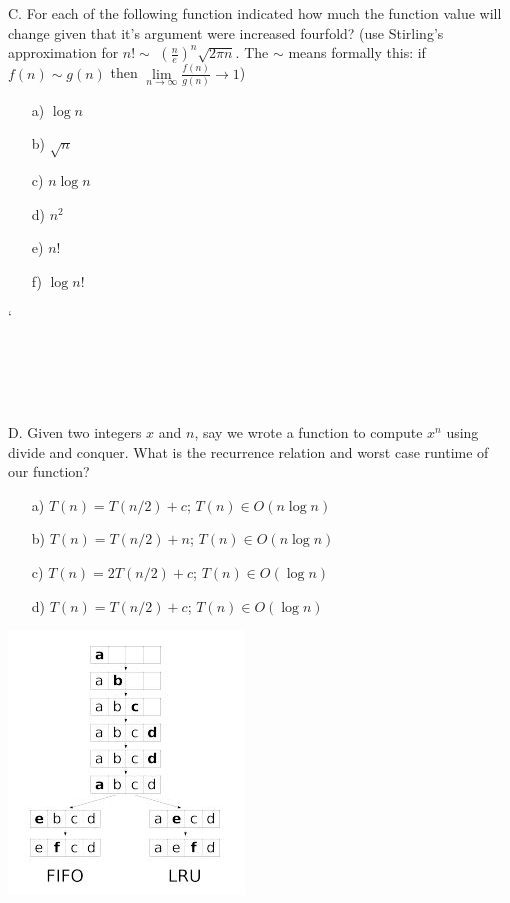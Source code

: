 \documentclass[12pt]{article}
\begin{document}
\newpage
\noindent C. For each of the following function indicated how much the function value will change given that it's argument were increased fourfold? (use Stirling's approximation for $n! \sim$ $(\frac{n}{e})^n\sqrt{2\pi n}$. The $\sim$ means formally this: if $f(n) \sim g(n)$ then $\lim\limits_{n\to\infty}{\frac{f(n)}{g(n)}\to1}$)
\begin{enumerate}
    \item[a)]$\log{n}$
    \item[b)]$\sqrt{n}$
    \item[c)]$n\log{n}$
    \item[d)]$n^2$
    \item[e)]$n!$
    \item[f)]$\log{n!}$
\end{enumerate}
`\\\\\\\\\\\\D. Given two integers $x$ and $n$, say we wrote a function to compute $x^n$ using divide and conquer. What is the recurrence relation and worst case runtime of our function?
\begin{enumerate}
    \item[a)]$T(n) = T(n/2) + c$; $T(n) \in O(n\log{n})$
    \item[b)]$T(n) = T(n/2) + n$; $T(n) \in O(n\log{n})$
    \item[c)] $T(n) = 2T(n/2) + c$; $T(n) \in O(\log{n})$
    \item[d)]$T(n) = T(n/2) + c$; $T(n) \in O(\log{n})$
\end{enumerate}
\newpage
\noindent \includegraphics{fifolru.jpg}\\
\end{document}
